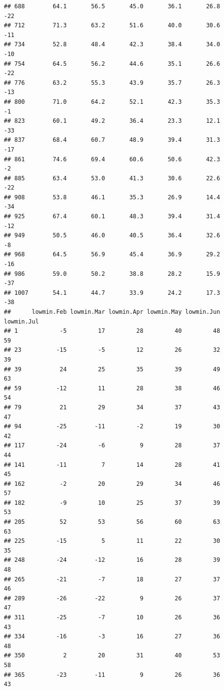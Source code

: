 \documentclass[
]{article}
\begin{document}
\begin{verbatim}
## 688        64.1       56.5       45.0       36.1       26.8        -22
## 712        71.3       63.2       51.6       40.0       30.6        -11
## 734        52.8       48.4       42.3       38.4       34.0        -10
## 754        64.5       56.2       44.6       35.1       26.6        -22
## 776        63.2       55.3       43.9       35.7       26.3        -13
## 800        71.0       64.2       52.1       42.3       35.3         -1
## 823        60.1       49.2       36.4       23.3       12.1        -33
## 837        68.4       60.7       48.9       39.4       31.3        -17
## 861        74.6       69.4       60.6       50.6       42.3         -2
## 885        63.4       53.0       41.3       30.6       22.6        -22
## 908        53.8       46.1       35.3       26.9       14.4        -34
## 925        67.4       60.1       48.3       39.4       31.4        -12
## 949        50.5       46.0       40.5       36.4       32.6         -8
## 968        64.5       56.9       45.4       36.9       29.2        -16
## 986        59.0       50.2       38.8       28.2       15.9        -37
## 1007       54.1       44.7       33.9       24.2       17.3        -38
##      lowmin.Feb lowmin.Mar lowmin.Apr lowmin.May lowmin.Jun lowmin.Jul
## 1            -5         17         28         40         48         59
## 23          -15         -5         12         26         32         39
## 39           24         25         35         39         49         63
## 59          -12         11         28         38         46         54
## 79           21         29         34         37         43         47
## 94          -25        -11         -2         19         30         42
## 117         -24         -6          9         28         37         44
## 141         -11          7         14         28         41         45
## 162          -2         20         29         34         46         57
## 182          -9         10         25         37         39         53
## 205          52         53         56         60         63         63
## 225         -15          5         11         22         30         35
## 248         -24        -12         16         28         39         48
## 265         -21         -7         18         27         37         46
## 289         -26        -22          9         26         37         47
## 311         -25         -7         10         26         36         43
## 334         -16         -3         16         27         36         48
## 350           2         20         31         40         53         58
## 365         -23        -11          9         26         36         43

\end{verbatim}
\end{document}
